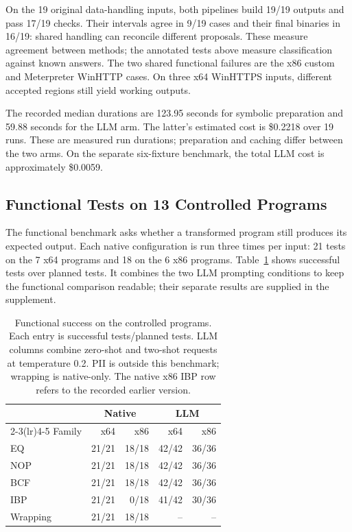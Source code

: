 On the 19 original data-handling inputs, both pipelines build 19/19
outputs and pass 17/19 checks. Their intervals agree in 9/19 cases and
their final binaries in 16/19: shared handling can reconcile different
proposals. These measure agreement between methods; the annotated tests
above measure classification against known answers. The two shared
functional failures are the x86 custom and Meterpreter WinHTTP cases.
On three x64 WinHTTPS inputs, different accepted regions still yield
working outputs.

The recorded median durations are 123.95 seconds for symbolic preparation
and 59.88 seconds for the LLM arm. The latter's estimated cost is \$0.2218
over 19 runs. These are measured run durations; preparation and caching differ
between the two arms. On the separate six-fixture benchmark,
the total LLM cost is approximately \$0.0059. 

\subsection{Functional Tests on 13 Controlled Programs}
The functional benchmark asks whether a transformed program still produces
its expected output. Each native configuration is run three times per
input: 21 tests on the 7 x64 programs and 18 on the 6 x86 programs.
Table~\ref{tab:controlled_functional} shows successful tests over planned
tests. It combines the two LLM prompting conditions to keep the functional
comparison readable; their separate results are supplied in the supplement.

\begin{table}[t]
\caption{Functional success on the controlled programs. Each entry is
successful tests/planned tests. LLM columns combine zero-shot and two-shot
requests at temperature 0.2. PII is outside this benchmark; wrapping is
native-only. The native x86 IBP row refers to the recorded earlier version.}
\label{tab:controlled_functional}
\centering\small\setlength{\tabcolsep}{7pt}
\begin{tabular}{@{}lrrrr@{}}
\toprule
 & \multicolumn{2}{c}{Native} & \multicolumn{2}{c}{LLM} \\
\cmidrule(lr){2-3}\cmidrule(lr){4-5}
Family & x64 & x86 & x64 & x86 \\
\midrule
EQ & 21/21 & 18/18 & 42/42 & 36/36 \\
NOP & 21/21 & 18/18 & 42/42 & 36/36 \\
BCF & 21/21 & 18/18 & 42/42 & 36/36 \\
IBP & 21/21 & 0/18 & 41/42 & 30/36 \\
Wrapping & 21/21 & 18/18 & -- & -- \\
\bottomrule
\end{tabular}
\end{table}


